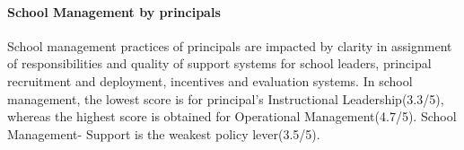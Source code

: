 \documentclass[
  twocolumn]{article}
\begin{document}
\hypertarget{school-management-by-principals}{%
\paragraph{\texorpdfstring{\textbf{School Management by
principals}}{School Management by principals}}\label{school-management-by-principals}}

School management practices of principals are impacted by clarity in
assignment of responsibilities and quality of support systems for school
leaders, principal recruitment and deployment, incentives and evaluation
systems. In school management, the lowest score is for principal's
Instructional Leadership(3.3/5), whereas the highest score is obtained
for Operational Management(4.7/5). School Management- Support is the
weakest policy lever(3.5/5).
\end{document}
